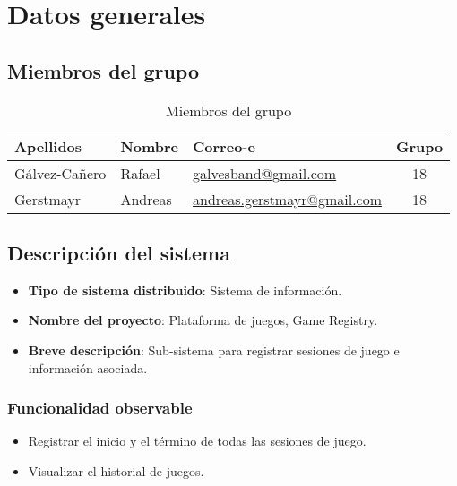 \chapter{Datos generales}

\section{Miembros del grupo}

\begin{table}[htdp]
\begin{center}
\begin{tabular}{|l|l|l|c|}
\hline
\textbf{Apellidos}&\textbf{Nombre}&\textbf{Correo-e}&\textbf{Grupo}\\
\hline
Gálvez-Cañero&Rafael&\href{mailto:galvesband@gmail.com}{galvesband@gmail.com}&18\\
Gerstmayr&Andreas&\href{mailto:andreas.gerstmayr@gmail.com}{andreas.gerstmayr@gmail.com}&18\\
\hline
\end{tabular}
\end{center}
\caption{Miembros del grupo}
\label{tab:miembros}
\end{table}%


\section{Descripción del sistema}

\begin{itemize}
\item \textbf{Tipo de sistema distribuido}: Sistema de información.
\item \textbf{Nombre del proyecto}: Plataforma de juegos, Game Registry.
\item \textbf{Breve descripción}: Sub-sistema para registrar sesiones de juego e información asociada.
\end{itemize}

\subsection{Funcionalidad observable}

\begin{itemize}
\item Registrar el inicio y el término de todas las sesiones de juego.
\item Visualizar el historial de juegos.
\end{itemize}

